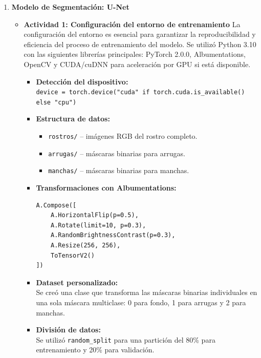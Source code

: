 \begin{enumerate}
  \item \textbf{Modelo de Segmentación: U-Net}
  \begin{itemize}
  \item\textbf{Actividad 1: Configuración del entorno de entrenamiento}
  La configuración del entorno es esencial para garantizar la reproducibilidad y eficiencia del proceso de entrenamiento del modelo. Se utilizó Python 3.10 con las siguientes librerías principales: PyTorch 2.0.0, Albumentations, OpenCV y CUDA/cuDNN para aceleración por GPU si está disponible.

\begin{itemize}
  \item \textbf{Detección del dispositivo:}\\
  \texttt{device = torch.device("cuda" if torch.cuda.is\_available() else "cpu")}
  
  \item \textbf{Estructura de datos:}
  \begin{itemize}
    \item \texttt{rostros/} -- imágenes RGB del rostro completo.
    \item \texttt{arrugas/} -- máscaras binarias para arrugas.
    \item \texttt{manchas/} -- máscaras binarias para manchas.
  \end{itemize}

  \item \textbf{Transformaciones con Albumentations:}
\begin{verbatim}
A.Compose([
    A.HorizontalFlip(p=0.5),
    A.Rotate(limit=10, p=0.3),
    A.RandomBrightnessContrast(p=0.3),
    A.Resize(256, 256),
    ToTensorV2()
])
\end{verbatim}

  \item \textbf{Dataset personalizado:} \\
  Se creó una clase que transforma las máscaras binarias individuales en una sola máscara multiclase: 0 para fondo, 1 para arrugas y 2 para manchas.

  \item \textbf{División de datos:} \\
  Se utilizó \texttt{random\_split} para una partición del 80\% para entrenamiento y 20\% para validación.
\end{itemize}

\vspace{0.5cm}


\end{itemize}
\end{enumerate}
